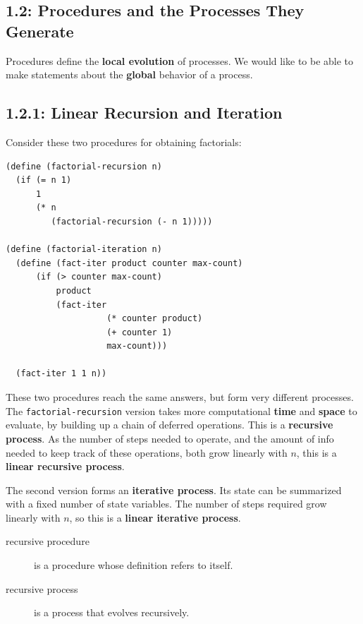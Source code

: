 \documentclass[final,fleqn,titlepage,twoside]{article}
\begin{document}
\subsection{1.2: Procedures and the Processes They Generate}
\label{sec:orgadb8cb0}
Procedures define the \textbf{local evolution} of processes. We would like to be able
to make statements about the \textbf{global} behavior of a process.

\subsection{1.2.1: Linear Recursion and Iteration}
\label{sec:org396316d}
Consider these two procedures for obtaining factorials:

\begin{verbatim}
(define (factorial-recursion n)
  (if (= n 1)
      1
      (* n 
         (factorial-recursion (- n 1)))))

(define (factorial-iteration n)
  (define (fact-iter product counter max-count)
      (if (> counter max-count)
          product
          (fact-iter
                    (* counter product)
                    (+ counter 1)
                    max-count)))
  
  (fact-iter 1 1 n))
\end{verbatim}

These two procedures reach the same answers, but form very different processes.
The \texttt{factorial-recursion} version takes more computational \textbf{time} and
\textbf{space} to evaluate, by building up a chain of deferred operations. This is a
\textbf{recursive process}. As the number of steps needed to operate, and the amount of
info needed to keep track of these operations, both grow linearly with \(n\),
this is a \textbf{linear recursive process}.

The second version forms an \textbf{iterative process}. Its state can be summarized
with a fixed number of state variables. The number of steps required grow
linearly with \(n\), so this is a \textbf{linear iterative process}.

\begin{description}
\item[{recursive procedure}] is a procedure whose definition refers to itself.
\item[{recursive process}] is a process that evolves recursively.
\end{description}
\end{document}

